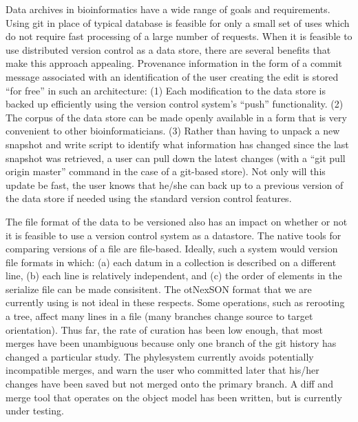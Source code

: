 \documentclass{bioinfo}
\newcommand{\ps}{phylesystem\xspace}
\newcommand{\nexson}{otNexSON\xspace}
\begin{document}
Data archives in bioinformatics have a wide range of goals and requirements.
Using git in place of typical database is feasible for only a small set of uses which do not require
    fast processing of a large number of requests.
When it is feasible to use distributed version control as a data store, there are several benefits
    that make this approach appealing.
Provenance information in the form of a commit message associated with an identification of the 
    user creating the edit is stored ``for free'' in such an architecture:
(1) Each modification to the data store is backed up efficiently using the version control system's ``push'' functionality.
(2) The corpus of the data store can be made openly available in a form that is very convenient to
    other bioinformaticians.
(3) Rather than having to unpack a new snapshot and write script to identify
    what information has changed since the last snapshot was retrieved, a user can pull down
    the latest changes (with a ``git pull origin master'' command in the case of a git-based store).
Not only will this update be fast, the user knows that he/she can back up to a previous version of the 
    data store if needed using the standard version control features.

The file format of the data to be versioned also has an impact on whether or not it is feasible
    to use a version control system as a datastore.
The native tools for comparing versions of a file are file-based.
Ideally, such a system would version file formats in which:
    (a) each datum in a collection is described on a different line, 
    (b) each line is relatively independent, and 
    (c) the order of elements in the serialize file can be made consisitent.
The \nexson format that we are currently using is not ideal in these respects.
Some operations, such as rerooting a tree,
    affect many lines in a file (many branches change source to target orientation).
Thus far, the rate of curation has been low enough, that most merges have been unambiguous because
    only one branch of the git history has changed a particular study.
The \ps currently avoids potentially incompatible merges, and warn the user who committed later that his/her
    changes have been saved but not merged onto the primary branch.
A diff and merge tool that operates on the object model has been written, but is currently under testing.
\end{document}
